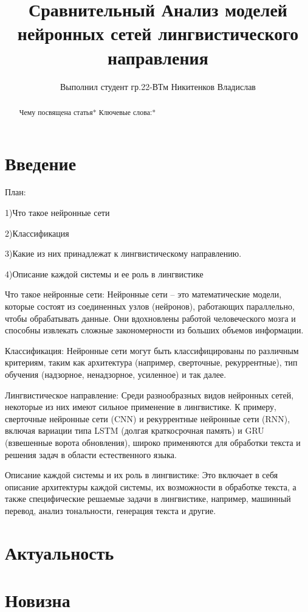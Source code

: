 \documentclass{article}
\title{Сравнительный Анализ моделей нейронных сетей лингвистического направления}
\author{Выполнил студент гр.22-ВТм Никитенков Владислав}
\begin{document}
\maketitle

\begin{abstract}
Чему посвящена статья*
\cite{7952603}\cite{DBLP:journals/corr/abs-1906-03591}
Ключевые слова:*
\end{abstract}

\section{Введение}
План:

1)Что такое нейронные сети

2)Классификация

3)Какие из них принадлежат к лингвистическому направлению.

4)Описание каждой системы и ее роль в лингвистике

Что такое нейронные сети:
Нейронные сети – это математические модели, которые состоят из соединенных узлов (нейронов), работающих параллельно, чтобы обрабатывать данные. Они вдохновлены работой человеческого мозга и способны извлекать сложные закономерности из больших объемов информации.

Классификация:
Нейронные сети могут быть классифицированы по различным критериям, таким как архитектура (например, сверточные, рекуррентные), тип обучения (надзорное, ненадзорное, усиленное) и так далее.

Лингвистическое направление:
Среди разнообразных видов нейронных сетей, некоторые из них имеют сильное применение в лингвистике. К примеру, сверточные нейронные сети (CNN) и рекуррентные нейронные сети (RNN), включая вариации типа LSTM (долгая краткосрочная память) и GRU (взвешенные ворота обновления), широко применяются для обработки текста и решения задач в области естественного языка.

Описание каждой системы и их роль в лингвистике:
Это включает в себя описание архитектуры каждой системы, их возможности в обработке текста, а также специфические решаемые задачи в лингвистике, например, машинный перевод, анализ тональности, генерация текста и другие.
\section{Актуальность}
\section{Новизна}
\end{document}
